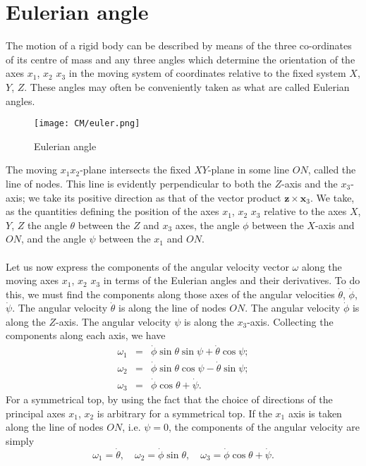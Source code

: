 \section{Eulerian angle}
The motion of a rigid body can be described by means of the three co-ordinates of its centre of mass and any three angles which determine the orientation of the axes $x_1$, $x_2$ $x_3$ in the moving system of coordinates relative to the fixed system $X$, $Y$, $Z$. These angles may often be conveniently taken as what are called Eulerian angles.
\begin{figure}[!h]
	\centering
	\texttt{[image: CM/euler.png]}
	\caption{Eulerian angle}
\end{figure}
The moving $x_1x_2$-plane intersects the fixed $XY$-plane in some line $ON$, called the line of nodes. 
This line is evidently perpendicular to both the $Z$-axis and the $x_3$-axis; we take its positive direction as that of the vector product $\bm{z} \times \bm{x}_3$.
We take, as the quantities defining the position of the axes $x_1$, $x_2$ $x_3$ relative to the axes $X$, $Y$, $Z$ the angle $\theta$ between the $Z$ and $x_3$ axes, the angle $\phi$ between the $X$-axis and $ON$, and the angle $\psi$  between the $x_1$ and $ON$.
\\ \\
Let us now express the components of the angular velocity  vector $\omega$ along the moving axes $x_1$, $x_2$ $x_3$ in terms of the Eulerian angles and their derivatives. 
To do this, we must find the components along those axes of the angular velocities $\dot{\theta}$, $\dot{\phi}$, $\dot{\psi}$. The angular velocity $\dot{\theta}$ is along the line of nodes $ON$. The angular velocity $\dot{\phi}$ is along the $Z$-axis. The angular velocity $\psi$ is along the $x_3$-axis. Collecting the components along each axis, we have
\begin{eqnarray}
\omega_1 &=& \dot{\phi}\sin\theta\sin\psi + \dot{\theta}\cos\psi; \nonumber \\
\omega_2 &=& \dot{\phi}\sin\theta\cos\psi - \dot{\theta}\sin\psi; \nonumber \\
\omega_3 &=& \dot{\phi} \cos\theta + \dot{\psi}. \nonumber
\end{eqnarray}
For a symmetrical top, by using the fact that the choice of directions of the principal axes $x_1$, $x_2$ is arbitrary for a symmetrical top. 
If the $x_1$ axis is taken along the line of nodes $ON$, i.e. $\psi = 0$, the components of the angular velocity are simply
\[\omega_1 = \dot{\theta} ,\quad \omega_2 = \dot{\phi}\sin\theta ,\quad \omega_3 = \dot{\phi}\cos\theta + \dot{\psi}.\]
